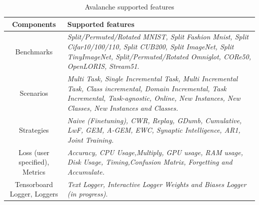 \documentclass[english, LaM, oneside]{sapthesis}%
\begin{document}
\begin{table}[h!]
            \centering
            \begin{tabular}{ |c|p{86mm}|  }
                \hline
                \textbf{Components} & \textbf{Supported features}\\
                \hline \hline
                Benchmarks & \textit{Split/Permuted/Rotated MNIST, Split Fashion Mnist, Split Cifar10/100/110, Split CUB200, Split ImageNet, Split TinyImageNet, Split/Permuted/Rotated Omniglot, CORe50, OpenLORIS, Stream51}.\\
                \hline
                Scenarios & \textit{Multi Task, Single Incremental Task, Multi Incremental Task, Class incremental, Domain Incremental, Task Incremental, Task-agnostic, Online, New Instances, New Classes, New Instances and Classes.}\\
                \hline
                Strategies & \textit{Naive (Finetuning), CWR, Replay, GDumb, Cumulative, LwF, GEM, A-GEM, EWC, Synaptic Intelligence, AR1, Joint Training.}\\
                \hline
                Loss (user specified), Metrics & \textit{Accuracy, CPU Usage,Multiply, GPU usage, RAM usage, Disk Usage, Timing,Confusion Matrix, Forgetting and Accumulate.}\\
                \hline
                Tensorboard Logger, Loggers & \textit{Text Logger, Interactive Logger Weights and Biases Logger (in progress)}.\\

                \hline 
            \end{tabular}
            
            \caption{Avalanche supported features}
            \label{tab:avalanche_featurs}
        \end{table}
\end{document}
